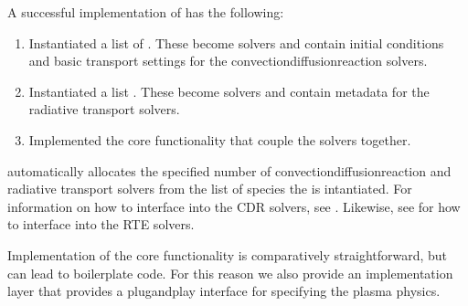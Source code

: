 \documentclass[letterpaper,10pt,english]{sphinxmanual}
\begin{document}
\sphinxAtStartPar
A successful implementation of {\hyperref[\detokenize{Applications/CdrPlasmaModel:chap-cdrplasmaphysics}]{}} has the following:
\begin{enumerate}
%
\item {} 
\sphinxAtStartPar
Instantiated a list of {\hyperref[\detokenize{Solvers/CDR:chap-cdrspecies}]{}}.
These become {\hyperref[\detokenize{Solvers/CDR:chap-cdr}]{}} solvers and contain initial conditions and basic transport settings for the convection\sphinxhyphen{}diffusion\sphinxhyphen{}reaction solvers.

\item {} 
\sphinxAtStartPar
Instantiated a list {\hyperref[\detokenize{Solvers/RTE:chap-rtspecies}]{}}.
These become {\hyperref[\detokenize{Solvers/RTE:chap-radiativetransfer}]{}} solvers and contain metadata for the radiative transport solvers.

\item {} 
\sphinxAtStartPar
Implemented the core functionality that couple the solvers together.

\end{enumerate}

\sphinxAtStartPar
{} automatically allocates the specified number of convection\sphinxhyphen{}diffusion\sphinxhyphen{}reaction and radiative transport solvers from the list of species the is intantiated.
For information on how to interface into the CDR solvers, see {\hyperref[\detokenize{Solvers/CDR:chap-cdrspecies}]{}}.
Likewise, see {\hyperref[\detokenize{Solvers/RTE:chap-rtspecies}]{}} for how to interface into the RTE solvers.

\sphinxAtStartPar
Implementation of the core functionality is comparatively straightforward, but can lead to boilerplate code.
For this reason we also provide an implementation layer {\hyperref[\detokenize{Applications/CdrPlasmaModel:chap-cdrplasmajson}]{}} that provides a plug\sphinxhyphen{}and\sphinxhyphen{}play interface for specifying the plasma physics.
\end{document}
